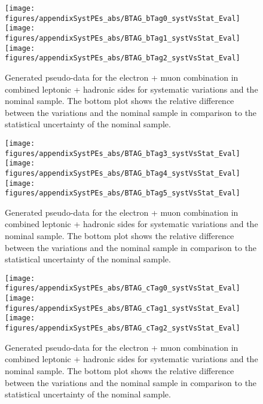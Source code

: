 \begin{figure}[!hb]
\begin{center}
        \texttt{[image: figures/appendixSystPEs\_abs/BTAG\_bTag0\_systVsStat\_Eval]}\\
        \texttt{[image: figures/appendixSystPEs\_abs/BTAG\_bTag1\_systVsStat\_Eval]}\\
        \texttt{[image: figures/appendixSystPEs\_abs/BTAG\_bTag2\_systVsStat\_Eval]}
  
        \caption{Generated pseudo-data for the electron + muon combination in combined leptonic + hadronic sides for systematic variations and the nominal \ttbar sample. The bottom plot shows the relative difference between the variations and the nominal sample in comparison to the statistical uncertainty of the nominal sample.}   
        \label{fig:systematicVar_lephad_Btag_1_1}
        \end{center}                          
        \end{figure}

\begin{figure}[!hb]
\begin{center}
        \texttt{[image: figures/appendixSystPEs\_abs/BTAG\_bTag3\_systVsStat\_Eval]}\\
        \texttt{[image: figures/appendixSystPEs\_abs/BTAG\_bTag4\_systVsStat\_Eval]}\\
        \texttt{[image: figures/appendixSystPEs\_abs/BTAG\_bTag5\_systVsStat\_Eval]}
  
        \caption{Generated pseudo-data for the electron + muon combination in combined leptonic + hadronic sides for systematic variations and the nominal \ttbar sample. The bottom plot shows the relative difference between the variations and the nominal sample in comparison to the statistical uncertainty of the nominal sample.}   
        \label{fig:systematicVar_lephad_Btag_1_2}
        \end{center}                          
        \end{figure}
\begin{figure}[!hb]
\begin{center}
        \texttt{[image: figures/appendixSystPEs\_abs/BTAG\_cTag0\_systVsStat\_Eval]}\\
        \texttt{[image: figures/appendixSystPEs\_abs/BTAG\_cTag1\_systVsStat\_Eval]}\\
        \texttt{[image: figures/appendixSystPEs\_abs/BTAG\_cTag2\_systVsStat\_Eval]}
  
        \caption{Generated pseudo-data for the electron + muon combination in combined leptonic + hadronic sides for systematic variations and the nominal \ttbar sample. The bottom plot shows the relative difference between the variations and the nominal sample in comparison to the statistical uncertainty of the nominal sample.}   
        \label{fig:systematicVar_lephad_Btag_2_1}
        \end{center}                          
        \end{figure}


